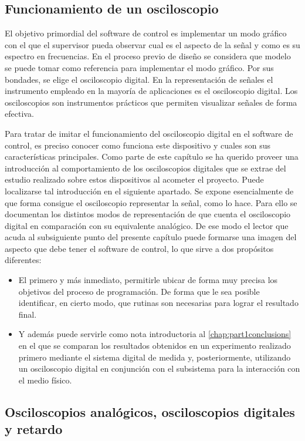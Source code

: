 \subsection{Funcionamiento de un osciloscopio}

El objetivo primordial del software de control es implementar un modo gráfico con el que el supervisor pueda observar cual es el aspecto de la señal y como es su espectro en frecuencias. En el proceso previo de diseño se considera que modelo se puede tomar como referencia para implementar el modo gráfico. Por sus bondades, se elige el osciloscopio digital. En la representación de señales el instrumento empleado en la mayoría de aplicaciones es el osciloscopio digital. Los osciloscopios son instrumentos prácticos que permiten visualizar señales de forma efectiva.\par
Para tratar de imitar el funcionamiento del osciloscopio digital en el software de control, es preciso conocer como funciona este dispositivo y cuales son sus características principales. Como parte de este capítulo se ha querido proveer una introducción al comportamiento de los osciloscopios digitales que se extrae del estudio realizado sobre estos dispositivos al acometer el proyecto. Puede localizarse tal introducción en el siguiente apartado. Se expone esencialmente de que forma consigue el osciloscopio representar la señal, como lo hace. Para ello se documentan los distintos modos de representación de que cuenta el osciloscopio digital en comparación con su equivalente analógico. De ese modo el lector que acuda al subsiguiente punto del presente capítulo puede formarse una imagen del aspecto que debe tener el software de control, lo que sirve a dos propósitos diferentes:

\begin{itemize}
	\item El primero y más inmediato, permitirle ubicar de forma muy precisa los objetivos del proceso de programación. De forma que le sea posible identificar, en cierto modo, que rutinas son necesarias para lograr el resultado final.
	\item Y además puede servirle como nota introductoria al \cref{chap:part1conclusions} en el que se comparan los resultados obtenidos en un experimento realizado primero mediante el sistema digital de medida y, posteriormente, utilizando un osciloscopio digital en conjunción con el subsistema para la interacción con el medio físico.
\end{itemize}


\subsection{Osciloscopios analógicos, osciloscopios digitales y retardo}

